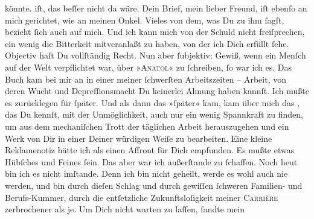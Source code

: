 \begin{ledgroupsized}[t]{13cm}
{{{                  könnte.}}}\label{K_L02709-3h} iſt, das beſſer nicht da wäre. Dein Brief, mein lieber Freund, iſt
                  {\pb}ebenſo an mich gerichtet, wie an meinen Onkel. Vieles von dem, was Du
               zu ihm ſagſt, bezieht ſich auch auf mich. Und ich kann mich von der Schuld nicht
               freiſprechen, ein wenig die Bitterkeit mitveranlaßt zu haben, von der ich Dich
               erfüllt ſehe. Objectiv haſt Du vollſtändig Recht. Nun aber ſubjektiv: Gewiß, wenn ein
               Menſch auf der Welt verpflichtet war, über »\textsc{Anatol}« zu ſchreiben, ſo war ich es. Das Buch kam bei mir an in einer
               meiner ſchwerſten Arbeitszeiten – Arbeit, von deren Wucht und Depreſ{\pb}ſionsmacht Du keinerlei Ahnung haben kannſt. Ich
               mußte es zurücklegen für ſpäter. Und als dann das »ſpäter« kam, kam über mich das
                  \label{K_L02709-44v}\label{K_L02709-44h}, das Du
               kennſt, mit der Unmöglichkeit, auch nur ein wenig Spannkraft zu finden, um aus dem
               mechaniſchen Trott der täglichen Arbeit herauszugehen und \strikeout{\textcolor{gray}{×}\-\textcolor{gray}{×}} ein Werk von Dir in
               einer Deiner würdigen Weiſe zu bearbeiten. Eine kleine Reklamenotiz hätte ich als
               einen Affront für Dich empfunden. Es mußte etwas Hübſches und Feines {\pb}ſein. Das aber war ich außerſtande zu ſchaffen. Noch
               heut bin ich es nicht imſtande. Denn ich bin nicht geheilt, werde es wohl auch nie
               werden, und bin durch dieſen Schlag und durch gewiſſen ſchweren Familien- und
               Berufs-Kummer, durch die entſetzliche Zukunftsloſigkeit meiner \textsc{Carrière} zerbrochener als je. Um Dich nicht warten zu laſſen, ſandte mein

\end{ledgroupsized}
